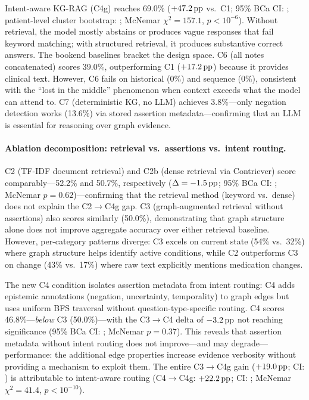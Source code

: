 Intent-aware KG-RAG (C4g) reaches 69.0\% ($+47.2\,\text{pp}$ vs.\ C1; 95\% BCa CI: \ci{+40.9\pp}{+52.8\pp}; patient-level cluster bootstrap: \ci{+40.2\pp}{+52.5\pp}; McNemar $\chi^2 = 157.1$, $p < 10^{-6}$).
Without retrieval, the model mostly abstains or produces vague responses that fail keyword matching; with structured retrieval, it produces substantive correct answers.
The bookend baselines bracket the design space.
C6 (all notes concatenated) scores 39.0\%, outperforming C1 ($+17.2\,\text{pp}$) because it provides clinical text.
However, C6 fails on historical (0\%) and sequence (0\%), consistent with the ``lost in the middle'' phenomenon when context exceeds what the model can attend to.
C7 (deterministic KG, no LLM) achieves 3.8\%---only negation detection works (13.6\%) via stored assertion metadata---confirming that an LLM is essential for reasoning over graph evidence.

\paragraph{Ablation decomposition: retrieval vs.\ assertions vs.\ intent routing.}
C2 (TF-IDF document retrieval) and C2b (dense retrieval via Contriever) score comparably---52.2\% and 50.7\%, respectively ($\Delta = -1.5\,\text{pp}$; 95\% BCa CI: \ci{-6.6\pp}{+3.5\pp}; McNemar $p = 0.62$)---confirming that the retrieval method (keyword vs.\ dense) does not explain the C2$\to$C4g gap.
C3 (graph-augmented retrieval without assertions) also scores similarly (50.0\%), demonstrating that graph structure alone does not improve aggregate accuracy over either retrieval baseline.
However, per-category patterns diverge: C3 excels on current state (54\% vs.\ 32\%) where graph structure helps identify active conditions, while C2 outperforms C3 on change (43\% vs.\ 17\%) where raw text explicitly mentions medication changes.

The new C4 condition isolates assertion metadata from intent routing: C4 adds epistemic annotations (negation, uncertainty, temporality) to graph edges but uses uniform BFS traversal without question-type-specific routing.
C4 scores 46.8\%---\emph{below} C3 (50.0\%)---with the C3$\to$C4 delta of $-3.2\,\text{pp}$ not reaching significance (95\% BCa CI: \ci{-10.0\pp}{+3.2\pp}; McNemar $p = 0.37$).
This reveals that assertion metadata without intent routing does not improve---and may degrade---performance: the additional edge properties increase evidence verbosity without providing a mechanism to exploit them.
The entire C3$\to$C4g gain ($+19.0\,\text{pp}$; CI: \ci{+13.8\pp}{+24.0\pp}) is attributable to intent-aware routing (C4$\to$C4g: $+22.2\,\text{pp}$; CI: \ci{+16.0\pp}{+28.0\pp}; McNemar $\chi^2 = 41.4$, $p < 10^{-10}$).

